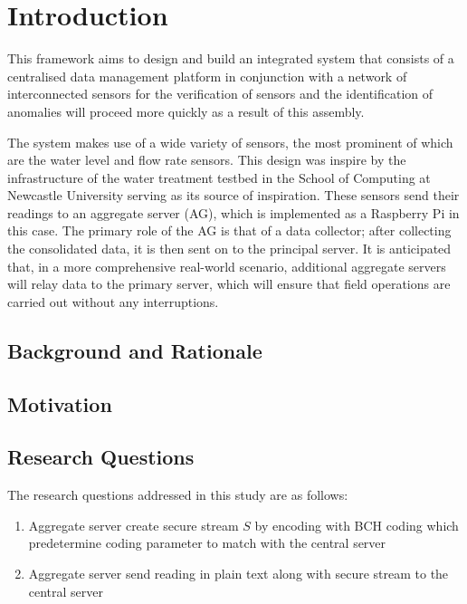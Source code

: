 \chapter{Introduction}

This framework aims  to design and build an integrated system that consists of a centralised data management platform in conjunction with a network of interconnected sensors for the verification of sensors and the identification of anomalies will proceed more quickly as a result of this assembly.

The system makes use of a wide variety of sensors, the most prominent of which are the water level and flow rate sensors. This design was inspire by the infrastructure of the water treatment testbed in the School of Computing at Newcastle University serving as its source of inspiration. These sensors send their readings to an aggregate server (AG), which is implemented as a Raspberry Pi in this case. The primary role of the AG is that of a data collector; after collecting the consolidated data, it is then sent on to the principal server. It is anticipated that, in a more comprehensive real-world scenario, additional aggregate servers will relay data to the primary server, which will ensure that field operations are carried out without any interruptions.

\section{Background and Rationale}
\lipsum[1]

\section{Motivation}
\lipsum[1]

\section{Research Questions}
The research questions addressed in this study are as follows:
\begin{enumerate}
	\item Aggregate server create secure stream $S$ by encoding with BCH coding which predetermine coding parameter to match with the central server
	\item Aggregate server send reading in plain text along with secure stream to the central server
\end{enumerate}

